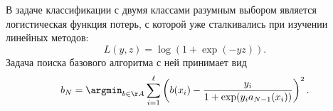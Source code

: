 \documentclass[12pt,fleqn]{article}
\begin{document}
В задаче классификации с двумя классами
разумным выбором является логистическая функция потерь,
с которой уже сталкивались при изучении линейных методов:
\[
    L(y, z)
    =
    \log(
        1 + \exp(-yz)
    ).
\]
Задача поиска базового алгоритма с ней принимает вид
\[
    b_N
    =
    \argmin_{b \in \AA}
    \sum_{i = 1}^{\ell} \left(
        b(x_i)
        -
        \frac{
            y_i
        }{
            1 + \exp(
                y_i a_{N - 1}(x_i)
            )
        }
    \right)^2.
\]


\end{document}
